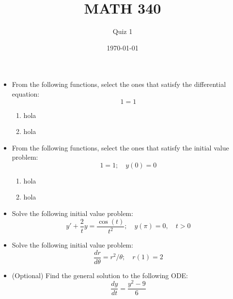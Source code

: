 \documentclass{article}
\begin{document}
\title{MATH 340}
\author{Quiz 1}
\date{\today}
\maketitle

\begin{itemize}
	\item From the following functions, select the ones that satisfy the differential equation:
		\[1=1\]
\begin{enumerate}
	\item hola
	\item hola
\end{enumerate}
\end{itemize}

\begin{itemize}
	\item From the following functions, select the ones that satisfy the initial value problem:
		\[1=1;\quad y(0)=0\]
\begin{enumerate}
	\item hola
	\item hola
\end{enumerate}
\item Solve the following initial value problem:
	\[y'+\frac{2}{t}y=\frac{\cos(t)}{t^2};\quad y(\pi)=0,\quad t>0\]
\item Solve the following initial value problem:
	\[\frac{dr}{d\theta}=r^2/\theta;\quad r(1)=2\]
\item (Optional) Find the general solution to the following ODE:
	\[\frac{dy}{dt}=\frac{y^2-9}{6}\]
\end{itemize}
\end{document}
